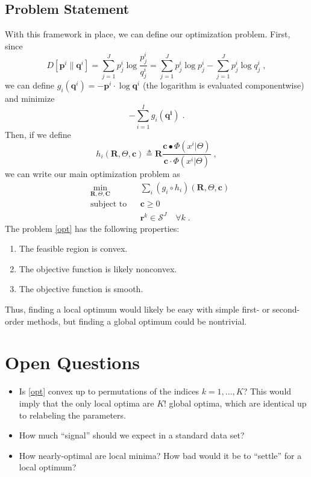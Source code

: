 \documentclass[english]{scrartcl}
\begin{document}
	\subsection{Problem Statement}
		With this framework in place, we can define our optimization problem. First, since 
		\begin{equation}
			D[\mathbf{p}^i \| \mathbf{q}^i] = \sum_{j = 1}^J p^i_j \log \frac{p^i_j}{q^i_j} = \sum_{j = 1}^J p^i_j \log p^i_j - \sum_{j = 1}^J p^i_j \log q^i_j \;,
		\end{equation}
		we can define $g_i(\mathbf{q}^i) = - \mathbf{p}^i \cdot \log \mathbf{q}^i$ (the logarithm is evaluated componentwise) and minimize 
		\begin{equation}
			- \sum_{i = 1}^I g_i(\mathbf{q^i})\;.
		\end{equation}
		Then, if we define 
		\begin{equation}
			h_i(\mathbf{R}, \Theta, \mathbf{c}) \triangleq \mathbf{R} \frac{\mathbf{c} \bullet \Phi(x^i|\Theta)}{\mathbf{c} \cdot \Phi(x^i|\Theta)}\;,
 		\end{equation}
 		we can write our main optimization problem as 
 		\begin{equation}
	\begin{aligned}
		& \min_{\mathbf{R}, \Theta, \mathbf{C}} 
		& & \sum_i (g_i \circ h_i)(\mathbf{R}, \Theta, \mathbf{c})   \\
		& \text{subject to} 
		& & \mathbf{c} \geq 0 \\
		& & & \mathbf{r}^k \in \mathcal{S}^J \quad \forall k \;.
	\end{aligned} \label{opt}
	\end{equation}
	The problem \eqref{opt} has the following properties:  
	\begin{enumerate}
		\item The feasible region is convex. 
		\item The objective function is likely nonconvex.
		\item The objective function is smooth. 
	\end{enumerate}
	Thus, finding a local optimum would likely be easy with simple first- or second-order methods, but finding a global optimum could be nontrivial. 
\section{Open Questions}
	\begin{itemize}
		\item Is \eqref{opt} convex up to permutations of the indices $k = 1,\ldots,K$? This would imply that the only local optima are $K!$ global optima, which are identical up to relabeling the parameters. 
		\item How much ``signal'' should we expect in a standard data set? 
		\item How nearly-optimal are local minima? How bad would it be to ``settle'' for a local optimum?
	\end{itemize}
	
\end{document}
